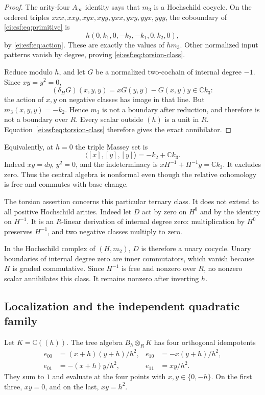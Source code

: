 \begin{proof}
The arity-four $A_\infty$ identity says that $m_3$ is a
Hochschild cocycle. On the ordered triples
$xxx,xxy,xyx,xyy,yxx,yxy,yyx,yyy$, the coboundary of
\eqref{ei:esf:eq:primitive} is
\[
 h(0,k_1,0,-k_2,-k_1,0,k_2,0),
\]
by \eqref{ei:esf:eq:action}. These are exactly the values
of $hm_3$. Other normalized input patterns vanish by
degree, proving \eqref{ei:esf:eq:torsion-class}.

Reduce modulo $h$, and let $G$ be a normalized two-cochain
of internal degree $-1$. Since $xy=y^2=0$,
\[
 (\delta_HG)(x,y,y)=xG(y,y)-G(x,y)y\in\mathbb Ck_3:
\]
the action of $x,y$ on negative classes has image in that line.
But $m_3(x,y,y)=-k_2$. Hence $m_3$ is not a boundary
after reduction, and therefore is not a boundary over $R$.
Every scalar outside $(h)$ is a unit in $R$.
Equation~\eqref{ei:esf:eq:torsion-class} therefore gives
the exact annihilator.
\end{proof}

Equivalently, at $h=0$ the triple Massey set is
\[
 \langle[x],[y],[y]\rangle=-k_2+\mathbb Ck_3.
\]
Indeed $xy=d\eta$, $y^2=0$, and the indeterminacy is
$xH^{-1}+H^{-1}y=\mathbb Ck_3$. It excludes zero.
Thus the central algebra is nonformal even though the
relative cohomology is free and commutes with base change.

\begin{remark}\label{ei:rem:unary-class}
The torsion assertion concerns this particular ternary class.
It does not extend to all positive Hochschild arities.
Indeed let $D$ act by zero on $H^0$ and by the identity on $H^{-1}$.
It is an $R$-linear derivation of internal degree zero: multiplication
by $H^0$ preserves $H^{-1}$, and two negative classes multiply to zero.

In the Hochschild complex of $(H,m_2)$, $D$ is therefore a unary
cocycle. Unary boundaries of internal degree zero are inner
commutators, which vanish because $H$ is graded commutative.
Since $H^{-1}$ is free and nonzero over $R$, no nonzero scalar
annihilates this class. It remains nonzero after inverting $h$.
\end{remark}

\subsection{Localization and the independent quadratic family}

Let $K=\mathbb C((h))$. The tree algebra $B_h\otimes_R K$
has four orthogonal idempotents
\begin{equation}\label{ei:esf:eq:idempotents}
 \begin{aligned}
 e_{00}&=(x+h)(y+h)/h^2,&e_{10}&=-x(y+h)/h^2,\\
 e_{01}&=-(x+h)y/h^2,&e_{11}&=xy/h^2.
 \end{aligned}
\end{equation}
They sum to $1$ and evaluate at the four points with
$x,y\in\{0,-h\}$. On the first three, $xy=0$, and on
the last, $xy=h^2$.

